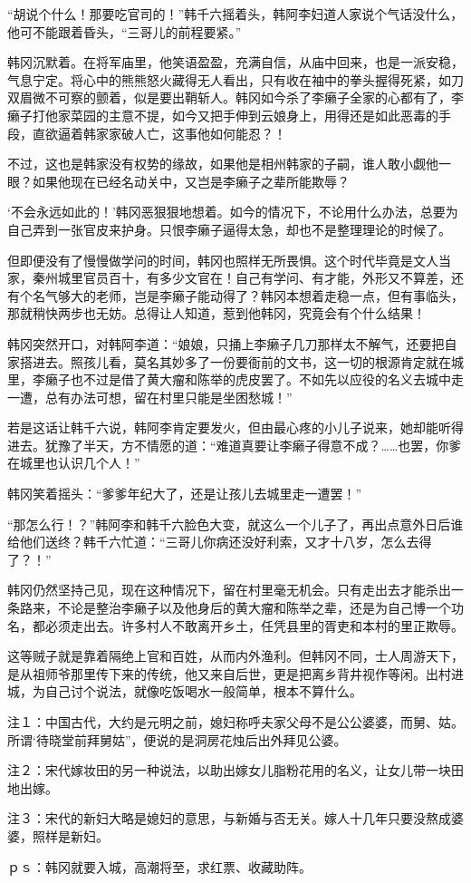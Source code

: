 “胡说个什么！那要吃官司的！”韩千六摇着头，韩阿李妇道人家说个气话没什么，他可不能跟着昏头，“三哥儿的前程要紧。”

韩冈沉默着。在将军庙里，他笑语盈盈，充满自信，从庙中回来，也是一派安稳，气息宁定。将心中的熊熊怒火藏得无人看出，只有收在袖中的拳头握得死紧，如刀双眉微不可察的颤着，似是要出鞘斩人。韩冈如今杀了李癞子全家的心都有了，李癞子打他家菜园的主意不提，如今又把手伸到云娘身上，用得还是如此恶毒的手段，直欲逼着韩家家破人亡，这事他如何能忍？！

不过，这也是韩家没有权势的缘故，如果他是相州韩家的子嗣，谁人敢小觑他一眼？如果他现在已经名动关中，又岂是李癞子之辈所能欺辱？

‘不会永远如此的！’韩冈恶狠狠地想着。如今的情况下，不论用什么办法，总要为自己弄到一张官皮来护身。只恨李癞子逼得太急，却也不是整理理论的时候了。

但即便没有了慢慢做学问的时间，韩冈也照样无所畏惧。这个时代毕竟是文人当家，秦州城里官员百十，有多少文官在！自己有学问、有才能，外形又不算差，还有个名气够大的老师，岂是李癞子能动得了？韩冈本想着走稳一点，但有事临头，那就稍快两步也无妨。总得让人知道，惹到他韩冈，究竟会有个什么结果！

韩冈突然开口，对韩阿李道：“娘娘，只捅上李癞子几刀那样太不解气，还要把自家搭进去。照孩儿看，莫名其妙多了一份要衙前的文书，这一切的根源肯定就在城里，李癞子也不过是借了黄大瘤和陈举的虎皮罢了。不如先以应役的名义去城中走一遭，总有办法可想，留在村里只能是坐困愁城！”

若是这话让韩千六说，韩阿李肯定要发火，但由最心疼的小儿子说来，她却能听得进去。犹豫了半天，方不情愿的道：“难道真要让李癞子得意不成？……也罢，你爹在城里也认识几个人！”

韩冈笑着摇头：“爹爹年纪大了，还是让孩儿去城里走一遭罢！”

“那怎么行！？”韩阿李和韩千六脸色大变，就这么一个儿子了，再出点意外日后谁给他们送终？韩千六忙道：“三哥儿你病还没好利索，又才十八岁，怎么去得了？！”

韩冈仍然坚持己见，现在这种情况下，留在村里毫无机会。只有走出去才能杀出一条路来，不论是整治李癞子以及他身后的黄大瘤和陈举之辈，还是为自己博一个功名，都必须走出去。许多村人不敢离开乡土，任凭县里的胥吏和本村的里正欺辱。

这等贼子就是靠着隔绝上官和百姓，从而内外渔利。但韩冈不同，士人周游天下，是从祖师爷那里传下来的传统，他又来自后世，更是把离乡背井视作等闲。出村进城，为自己讨个说法，就像吃饭喝水一般简单，根本不算什么。

注１：中国古代，大约是元明之前，媳妇称呼夫家父母不是公公婆婆，而舅、姑。所谓‘待晓堂前拜舅姑”，便说的是洞房花烛后出外拜见公婆。

注２：宋代嫁妆田的另一种说法，以助出嫁女儿脂粉花用的名义，让女儿带一块田地出嫁。

注３：宋代的新妇大略是媳妇的意思，与新婚与否无关。嫁人十几年只要没熬成婆婆，照样是新妇。

ｐｓ：韩冈就要入城，高潮将至，求红票、收藏助阵。

